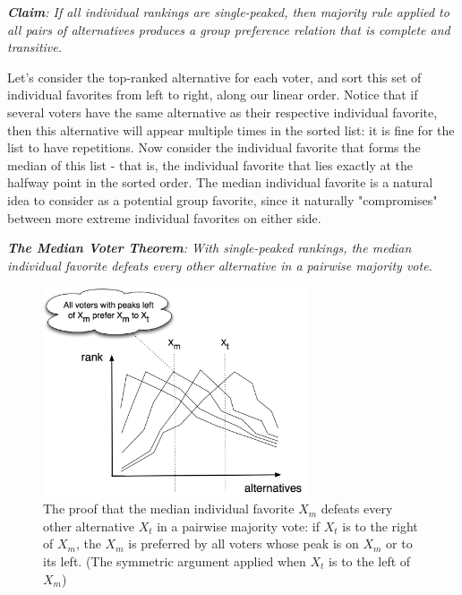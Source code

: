 \documentclass[twoside]{article}
\begin{document}
\textit{\textbf{Claim}: If all individual rankings are single-peaked, then majority rule applied to all pairs of alternatives produces a group preference relation that is complete and transitive.}

Let's consider the top-ranked alternative for each voter, and sort this set of individual favorites from left to right, along our linear order. Notice that if several voters have the same alternative as their respective individual favorite, then this alternative will appear multiple times in the sorted list: it is fine for the list to have repetitions. Now consider the individual favorite that forms the median of this list - that is, the individual favorite that lies exactly at the halfway point in the sorted order. The median individual favorite is a natural idea to consider as a potential group favorite, since it naturally "compromises" between more extreme individual favorites on either side.

\textit{\textbf{The Median Voter Theorem}: With single-peaked rankings, the median individual favorite defeats every other alternative in a pairwise majority vote.}

\begin{figure}[ht]
\includegraphics[width=0.7\textwidth]{image2}
\centering
\caption{The proof that the median individual favorite $X_m$ defeats every other alternative $X_t$ in a pairwise majority vote: if $X_t$ is to the right of $X_m$, the $X_m$ is preferred by all voters whose peak is on $X_m$ or to its left. (The symmetric argument applied when $X_t$ is to the left of $X_m$)}
\label{fig:figure2}
\end{figure}
\end{document}
